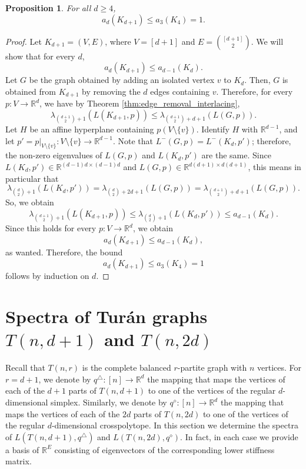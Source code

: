 \documentclass[a4paper,11pt]{article}
\theoremstyle{plain}
\newtheorem{proposition}[theorem]{\bf Proposition}
\theoremstyle{definition}
\newcommand{\Rea}{{\mathbb R}}
\begin{document}
\begin{proposition}
For all $d\geq 4$,
\[
    a_d(K_{d+1})\leq a_3(K_4)=1.
\]
\end{proposition}
\begin{proof}
Let $K_{d+1}=(V,E)$, where $V=[d+1]$ and $E=\binom{[d+1]}{2}$.
We will show that for every $d$,
\[
    a_d(K_{d+1})\leq a_{d-1}(K_{d}).
\]
Let $G$ be the graph obtained by adding an isolated vertex $v$ to $K_d$. Then, $G$ is obtained from $K_{d+1}$ by removing the $d$ edges containing $v$. Therefore, for every $p:V\to \Rea^d$, we have
by Theorem \ref{thm:edge_removal_interlacing},
\[
    \lambda_{\binom{d+1}{2}+1}(L(K_{d+1},p)) \leq \lambda_{\binom{d+1}{2}+d+1}(L(G,p)).
\]
Let $H$ be an affine hyperplane containing $p(V\setminus\{v\})$. Identify $H$ with $\Rea^{d-1}$, and let $p'=p|_{V\setminus\{v\}}: V\setminus\{v\}\to\Rea^{d-1}$.
Note that $L^{-}(G,p)=L^{-}(K_d,p')$; therefore,
the non-zero eigenvalues of $L(G,p)$ and $L(K_d,p')$ are the same. Since $L(K_d,p')\in \Rea^{(d-1)d \times (d-1)d}$ and $L(G,p)\in \Rea^{d(d+1)\times d(d+1)}$, this means in particular that
\[
\lambda_{\binom{d}{2}+1}(L(K_d,p')) =\lambda_{\binom{d}{2}+2d+1}(L(G,p))=\lambda_{\binom{d+1}{2}+d+1}(L(G,p)).
\]  
So, we obtain
\[
    \lambda_{\binom{d+1}{2}+1}(L(K_{d+1},p)) \leq \lambda_{\binom{d}{2}+1}(L(K_d,p')) \leq a_{d-1}(K_d).
\]
Since this holds for every $p:V\to \Rea^d$, we obtain
\[
   a_d(K_{d+1}) \leq a_{d-1}(K_d),
\]
as wanted. Therefore, the bound
\[
   a_d(K_{d+1}) \leq a_{3}(K_4)=1
\]
follows by induction on $d$.
\end{proof}









\section{Spectra of Tur{\'a}n graphs
$T(n,d+1)$ and $T(n,2d)$}\label{sec:Turan}

Recall that $T(n,r)$ is the complete balanced $r$-partite graph with $n$ vertices. For $r=d+1$, we denote by $q^{\triangle}: [n]\to \Rea^d$ the mapping that maps the vertices of each of the $d+1$ parts of $T(n,d+1)$ to one of the vertices of the regular $d$-dimensional simplex. Similarly, we denote by $q^{\diamond}:[n]\to \Rea^d$ the mapping that maps the vertices of each of the $2d$ parts of $T(n,2d)$ to one of the vertices of the regular $d$-dimensional crosspolytope.
In this section we determine the spectra of  $L(T(n,d+1),q^{\triangle})$ and $L(T(n,2d),q^{\diamond})$. 
In fact, in each case we provide a basis of $\Rea^{E}$ consisting of eigenvectors of the corresponding lower stiffness matrix.
\end{document}
